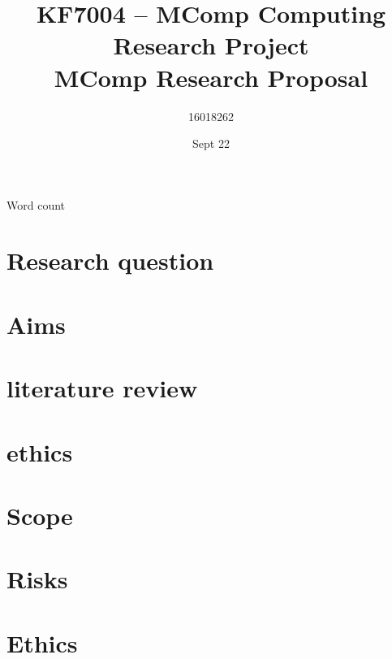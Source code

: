 \documentclass[10pt]{article}
\title{KF7004 – MComp Computing Research Project \\ MComp Research Proposal}
\author{16018262}
\date{Sept 22}
\begin{document}
\maketitle
\begin{center}
	Word count
\end{center}
\tableofcontents
\section{Research question}

\section{Aims}

\section{literature review}

\section{ethics}

\section{Scope}

\section{Risks}


\printbibliography
\appendix
\section{Ethics} \label{ethics}

\end{document}
